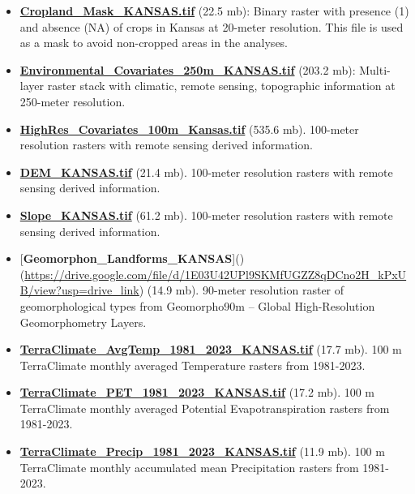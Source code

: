 \documentclass[
  10pt,
  b5paper,
  oneside]{book}
\providecommand{\tightlist}{%
  \setlength{\itemsep}{0pt}\setlength{\parskip}{0pt}}
\begin{document}
\begin{itemize}
\tightlist
\item
  \href{https://drive.google.com/file/d/1wh6xSW03YKrCHScJJa0c_cSA1XZ8tYY-/view?usp=drive_link}{\textbf{Cropland\_Mask\_KANSAS.tif}} (22.5 mb): Binary raster with presence (1) and absence (NA) of crops in Kansas at 20-meter resolution. This file is used as a mask to avoid non-cropped areas in the analyses.
\item
  \href{https://drive.google.com/file/d/1wURPmPLi2LdYq6zBhZN1e91EiiZsk8oX/view?usp=drive_link}{\textbf{Environmental\_Covariates\_250m\_KANSAS.tif}} (203.2 mb): Multi-layer raster stack with climatic, remote sensing, topographic information at 250-meter resolution.
\item
  \href{https://drive.google.com/file/d/1xf89gn4pBKsb5ynVIfKZd4MbT3ZL1Nf2/view?usp=drive_link}{\textbf{HighRes\_Covariates\_100m\_Kansas.tif}} (535.6 mb). 100-meter resolution rasters with remote sensing derived information.
\item
  \href{https://drive.google.com/file/d/14KmmjjTfVD7jTEuQqCLkfcQmXy0VBDkA/view?usp=drive_link}{\textbf{DEM\_KANSAS.tif}} (21.4 mb). 100-meter resolution rasters with remote sensing derived information.
\item
  \href{https://drive.google.com/file/d/1rESziVFlEvEEmrKacb88R1pKZxbrU7qS/view?usp=drive_link}{\textbf{Slope\_KANSAS.tif}} (61.2 mb). 100-meter resolution rasters with remote sensing derived information.
\item
  {[}\textbf{Geomorphon\_Landforms\_KANSAS}{]}()(\url{https://drive.google.com/file/d/1E03U42UPl9SKMfUGZZ8qDCno2H_kPxUB/view?usp=drive_link}) (14.9 mb). 90-meter resolution raster of geomorphological types from Geomorpho90m -- Global High-Resolution Geomorphometry Layers.
\item
  \href{https://drive.google.com/file/d/1TyyErHkQeNW9Q_wchW9Fa_0UpdaWS_-_/view?usp=drive_link}{\textbf{TerraClimate\_AvgTemp\_1981\_2023\_KANSAS.tif}} (17.7 mb). 100 m TerraClimate monthly averaged Temperature rasters from 1981-2023.
\item
  \href{https://drive.google.com/file/d/1b9wM3zwggBFS98pFEyWUFtpKN9ORq9we/view?usp=drive_link}{\textbf{TerraClimate\_PET\_1981\_2023\_KANSAS.tif}} (17.2 mb). 100 m TerraClimate monthly averaged Potential Evapotranspiration rasters from 1981-2023.
\item
  \href{https://drive.google.com/file/d/1xq6y8jNUjDbipXHQE1w67f_vxQeXACkH/view?usp=drive_link}{\textbf{TerraClimate\_Precip\_1981\_2023\_KANSAS.tif}} (11.9 mb). 100 m TerraClimate monthly accumulated mean Precipitation rasters from 1981-2023.

\end{itemize}
\end{document}
